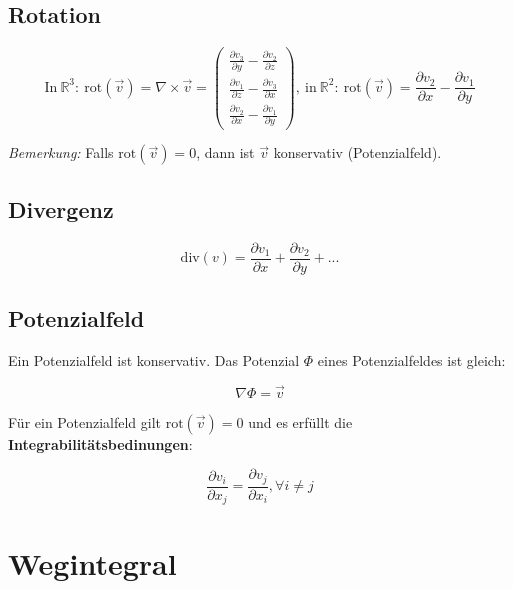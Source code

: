 \documentclass[11pt]{article}
\begin{document}
\subsection{Rotation}

\begin{equation*}
	\text{In}\ \mathbb{R}^3:\ \text{rot}(\vec{v})=\nabla\times \vec{v} =
	\begin{pmatrix}
		\frac{\partial v_3}{\partial y} - \frac{\partial v_2}{\partial z}\\
		\frac{\partial v_1}{\partial z} - \frac{\partial v_3}{\partial x}\\
		\frac{\partial v_2}{\partial x} - \frac{\partial v_1}{\partial y}
	\end{pmatrix},\ \text{in}\ \mathbb{R}^2:\ \text{rot}(\vec{v}) = \frac{\partial v_2}{\partial x} - \frac{\partial v_1}{\partial y}
\end{equation*}

\emph{Bemerkung:} Falls $\text{rot}(\vec{v})=0$, dann ist $\vec{v}$ konservativ (Potenzialfeld).

\subsection{Divergenz}
\begin{equation*}
	\text{div}(v)= \frac{\partial v_1}{\partial x} + \frac{\partial v_2}{\partial y} + ... 
\end{equation*}

\subsection{Potenzialfeld}

Ein Potenzialfeld ist konservativ. Das Potenzial $\Phi$ eines Potenzialfeldes ist gleich:

\begin{equation*}
	\nabla \Phi = \vec{v}
\end{equation*}

Für ein Potenzialfeld gilt $\text{rot}(\vec{v})=0$ und es erfüllt die \textbf{Integrabilitätsbedinungen}:

\begin{equation*}
	\frac{\partial v_i}{\partial x_j}=\frac{\partial v_j}{\partial x_i},\forall i \neq j
\end{equation*}

\section{Wegintegral}
\end{document}
